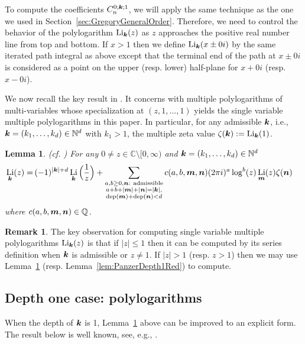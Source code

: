 \documentclass[11pt]{article}
\newcommand{\bfk}{{\boldsymbol{\sl{k}}}}
\newcommand{\bfm}{{\boldsymbol{\sl{m}}}}
\newcommand{\bfn}{{\boldsymbol{\sl{n}}}}
\DeclareMathOperator*{\dep}{dep}
\DeclareMathOperator{\Li}{Li}
\def\N{\mathbb{N}}
\def\Q{\mathbb{Q}}
\def\CC{\mathbb{C}}
\theoremstyle{plain}
\newtheorem{lem}[thm]{Lemma}
\theoremstyle{definition}
\newtheorem{re}[thm]{Remark}
\begin{document}
To compute the coefficients $C_{n}^{0;\bfk;1}$, we will apply the same technique as the one we used in Section~\ref{sec:GregoryGeneralOrder}. Therefore, we need to control the behavior of the polylogarithm $\Li_\bfk(z)$ as $z$ approaches the positive real number line from top and bottom. If $x>1$ then we define $\Li_\bfk(x\pm  0i)$ by the same iterated path integral as above except that the terminal end of the path at $x\pm 0i$ is considered as a point on the upper (resp. lower) half-plane for $x+ 0i$ (resp. $x-0i$).

We now recall the key result in \cite{Panzer2017}. It concerns with multiple polylogarithms of multi-variables whose specialization at $(z,1,\dots,1)$ yields the single variable multiple polylogarithms in this paper. In particular, for any admissible $\bfk$, i.e., $\bfk=(k_1,\dots,k_d)\in \N^d$ with $k_1>1$, the multiple zeta value $\zeta(\bfk):=\Li_\bfk(1)$.

\begin{lem} \label{lem:PanzerRed}
\emph{(cf. \cite[Theorem 1.2]{Panzer2017})}
For any $0\ne z\in\CC\setminus[0,\infty)$ and $\bfk=(k_1,\dots,k_d)\in \N^d$
\begin{align*}
 \Li_\bfk(z)=&\, (-1)^{|\bfk|+d} \Li_\bfk\Big(\frac1z\Big)
 + \sum_{
 \substack{ a,b\ge 0, \bfn: \ \text{admissible}\\
a+b+|\bfm|+|\bfn|=|\bfk|,\\
\dep(\bfm)+\dep(\bfn)< d
}} c(a,b,\bfm,\bfn) (2\pi i)^a \log^b(z) \Li_\bfm(z)\zeta(\bfn)
\end{align*}
where $c(a,b,\bfm,\bfn)\in\Q$.
\end{lem}

\begin{re}
The key observation for computing single variable multiple polylogarithms $\Li_\bfk(z)$ is that if $|z|\le 1$ then it can be computed by its series definition when $\bfk$ is admissible or $z\ne 1$. If $|z|>1$ (resp. $z>1$) then we may use Lemma~\ref{lem:PanzerRed} (resp. Lemma~\ref{lem:PanzerDepth1Red}) to compute.
\end{re}

\subsection{Depth one case: polylogarithms}

When the depth of $\bfk$ is 1, Lemma~\ref{lem:PanzerRed} above can be improved to an explicit form.
The result below is well known, see, e.g., \cite{Jonquiere1889,Panzer2017}.
\end{document}
